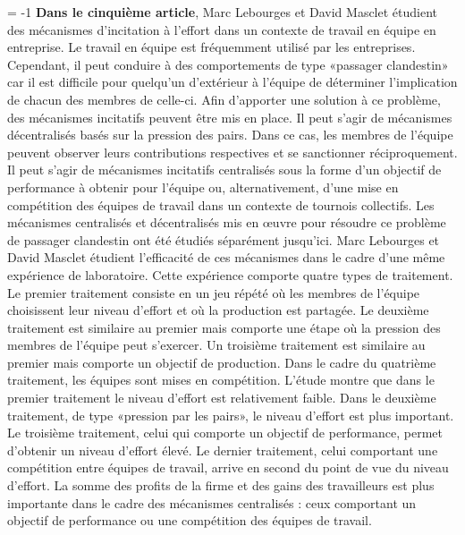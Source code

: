 \begin{Article}
\begin{refsection}[Intro]
\medskip

\looseness = -1
{\textbf{Dans le cinquième article}, Marc
Lebourges et David Masclet étudient des mécanismes d'incitation à
l'effort dans un contexte de travail en équipe en entreprise. Le travail
en équipe est fréquemment utilisé par les entreprises. Cependant, il
peut conduire à des comportements de type «passager clandestin» car il
est difficile pour quelqu'un d'extérieur à l'équipe de déterminer
l'implication de chacun des membres de celle-ci. Afin d'apporter une solution
à ce problème, des mécanismes incitatifs peuvent
être mis en place. Il peut s'agir de mécanismes décentralisés basés sur
la pression des pairs. Dans ce cas, les membres de l'équipe peuvent
observer leurs contributions respectives et se sanctionner
réciproquement. Il peut s'agir de mécanismes incitatifs centralisés sous
la forme d'un objectif de performance à obtenir pour l'équipe ou,
alternativement, d'une mise en compétition des équipes de travail dans
un contexte de tournois collectifs. Les mécanismes centralisés et
décentralisés mis en œuvre pour résoudre ce problème de passager
clandestin ont été étudiés séparément jusqu'ici. Marc Lebourges et David
Masclet étudient l'efficacité de ces mécanismes dans le cadre d'une même
expérience de laboratoire. Cette expérience comporte quatre types de
traitement. Le premier traitement consiste en un jeu répété où les
membres de l'équipe choisissent leur niveau d'effort et où la production
est partagée. Le deuxième traitement est similaire au premier mais
comporte une étape où la pression des membres de l'équipe peut
s'exercer. Un troisième traitement est similaire au premier mais
comporte un objectif de production. Dans le cadre du quatrième
traitement, les équipes sont mises en compétition. L'étude montre que
dans le premier traitement le niveau d'effort est relativement faible.
Dans le deuxième traitement, de type «pression par les pairs», le
niveau d'effort est plus important. Le troisième traitement, celui qui
comporte un objectif de performance, permet d'obtenir un niveau d'effort
élevé. Le dernier traitement, celui comportant une compétition entre
équipes de travail, arrive en second du point de vue du niveau d'effort.
La somme des profits de la firme et des gains des travailleurs est plus
importante dans le cadre des mécanismes centralisés : ceux comportant un
objectif de performance ou une compétition des équipes de travail.}

\medskip


\end{refsection}
\end{Article}
